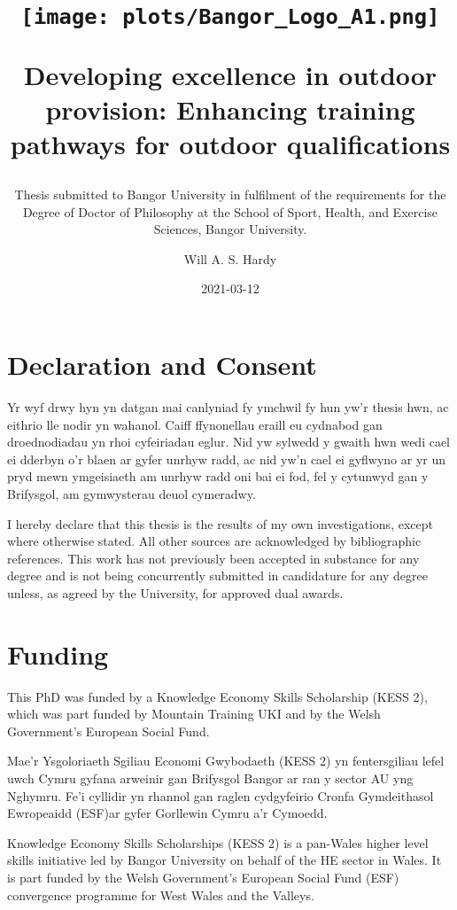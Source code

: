 \documentclass[
  12pt,
  a4paper,
]{book}
\title{\texttt{[image: plots/Bangor\_Logo\_A1.png]}

\textbf{Developing excellence in outdoor provision: Enhancing training pathways for outdoor qualifications}}
\subtitle{\hfill \break  Thesis submitted to Bangor University in fulfilment of the requirements for the Degree of Doctor of Philosophy at the School of Sport, Health, and Exercise Sciences, Bangor University.}
\author{Will A. S. Hardy}
\date{2021-03-12}
\begin{document}
\maketitle

\frontmatter

\section*{Declaration and Consent}

Yr wyf drwy hyn yn datgan mai canlyniad fy ymchwil fy hun yw’r thesis hwn, ac eithrio lle nodir yn wahanol. Caiff ffynonellau eraill eu cydnabod gan droednodiadau yn rhoi cyfeiriadau eglur. Nid yw sylwedd y gwaith hwn wedi cael ei dderbyn o’r blaen ar gyfer unrhyw radd, ac nid yw’n cael ei gyflwyno ar yr un pryd mewn ymgeisiaeth am unrhyw radd oni bai ei fod, fel y cytunwyd gan y Brifysgol, am gymwysterau deuol cymeradwy.

I hereby declare that this thesis is the results of my own investigations, except where otherwise stated.  All other sources are acknowledged by bibliographic references. This work has not previously been accepted in substance for any degree and is not being concurrently submitted in candidature for any degree unless, as agreed by the University, for approved dual awards.


\section*{Funding}

This PhD was funded by a Knowledge Economy Skills Scholarship (KESS 2), which was part funded by Mountain Training UKI and by the Welsh Government's European Social Fund.

Mae’r Ysgoloriaeth Sgiliau Economi Gwybodaeth (KESS 2) yn fentersgiliau lefel uwch Cymru gyfana arweinir gan Brifysgol Bangor ar ran y sector AU yng Nghymru. Fe’i cyllidir yn rhannol gan raglen cydgyfeirio Cronfa Gymdeithasol Ewropeaidd (ESF)ar gyfer Gorllewin Cymru a’r Cymoedd.

Knowledge Economy Skills Scholarships (KESS 2) is a pan-Wales higher level skills initiative led by Bangor University on behalf of the HE sector in Wales. It is part funded by the Welsh Government’s European Social Fund (ESF) convergence programme for West Wales and the Valleys.

\newpage
\end{document}
